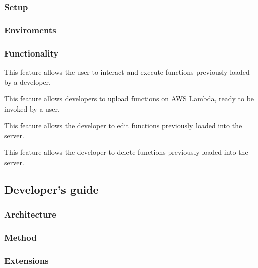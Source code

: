 		\subsubsection{Setup} %
		
		\subsubsection{Enviroments} %
		
		\subsubsection{Functionality} %
					This feature allows the user to interact and execute functions previously loaded by a developer.
					
					This feature allows developers to upload functions on AWS Lambda, ready to be invoked by a user.
				
					This feature allows the developer to edit functions previously loaded into the server.
				
					This feature allows the developer to delete functions previously loaded into the server.
	
	
	\subsection{Developer's guide}
	
		\subsubsection{Architecture} %
		
		\subsubsection{Method} %
			
		
		\subsubsection{Extensions}  %
